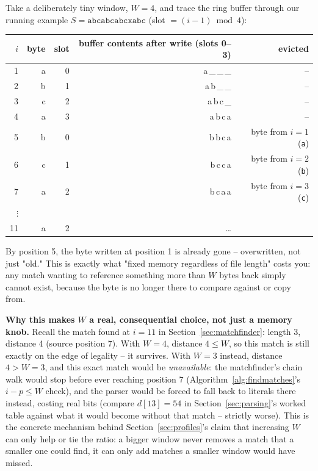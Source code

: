 \documentclass[11pt]{article}
\begin{document}
\begin{tcolorbox}[colback=green!5!white,colframe=green!45!black,title={Worked example: watching eviction happen, and how $W$ changes what's even possible}]
Take a deliberately tiny window, $W{=}4$, and trace the ring buffer through our running
example $S = \texttt{abcabcabcxabc}$ (slot $= (i{-}1) \bmod 4$):
\begin{center}
\begin{tabular}{@{}rrrrr@{}}
\toprule
$i$ & byte & slot & buffer contents after write (slots 0--3) & evicted \\
\midrule
1 & a & 0 & a\,\_\,\_\,\_ & -- \\
2 & b & 1 & a\,b\,\_\,\_ & -- \\
3 & c & 2 & a\,b\,c\,\_ & -- \\
4 & a & 3 & a\,b\,c\,a & -- \\
5 & b & 0 & b\,b\,c\,a & byte from $i{=}1$ (\texttt{a}) \\
6 & c & 1 & b\,c\,c\,a & byte from $i{=}2$ (\texttt{b}) \\
7 & a & 2 & b\,c\,a\,a & byte from $i{=}3$ (\texttt{c}) \\
$\vdots$ & & & & \\
11 & a & 2 & \dots & \\
\bottomrule
\end{tabular}
\end{center}
By position 5, the byte written at position 1 is already gone -- overwritten, not just
"old." This is exactly what "fixed memory regardless of file length" costs you: any
match wanting to reference something more than $W$ bytes back simply cannot exist,
because the byte is no longer there to compare against or copy from.

\textbf{Why this makes $W$ a real, consequential choice, not just a memory knob.}
Recall the match found at $i{=}11$ in Section~\ref{sec:matchfinder}: length 3, distance
4 (source position 7). With $W{=}4$, distance $4 \le W$, so this match is still exactly
on the edge of legality -- it survives. With $W{=}3$ instead, distance $4 > W{=}3$, and
this exact match would be \emph{unavailable}: the matchfinder's chain walk would stop
before ever reaching position 7 (Algorithm~\ref{alg:findmatches}'s $i-p \le W$ check),
and the parser would be forced to fall back to literals there instead, costing real bits
(compare $d[13]{=}54$ in Section~\ref{sec:parsing}'s worked table against what it would
become without that match -- strictly worse). This is the concrete mechanism behind
Section~\ref{sec:profiles}'s claim that increasing $W$ can only help or tie the ratio:
a bigger window never removes a match that a smaller one could find, it can only add
matches a smaller window would have missed.
\end{tcolorbox}
\end{document}
